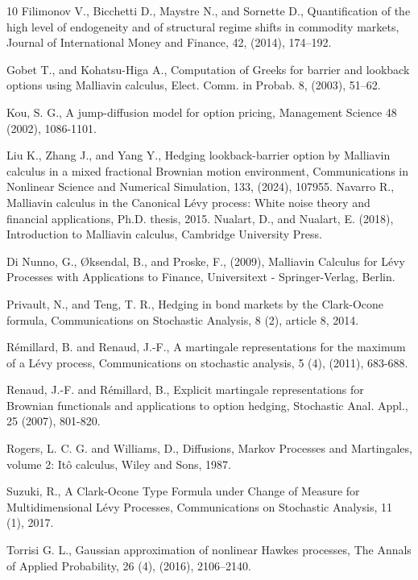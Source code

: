 \documentclass[11pt]{article}
\numberwithin{equation}{section}
\begin{document}
\begin{thebibliography}{10}
 { Filimonov  V.,  Bicchetti D., Maystre N., and  Sornette D.}, {Quantification of the high level
of endogeneity and of structural regime shifts in commodity markets}, Journal of International
Money and Finance, 42, (2014), 174–192.

 Gobet T., and  Kohatsu-Higa A., Computation of Greeks for barrier and lookback options using Malliavin calculus, Elect. Comm. in Probab. 8, (2003), 51–62.

  Kou, S. G., A jump-diffusion model for option pricing, Management Science 48 (2002), 1086-1101.

 Liu K., Zhang J., and Yang Y., Hedging lookback-barrier option by Malliavin calculus in a mixed
fractional Brownian motion environment, Communications in Nonlinear Science and Numerical Simulation, 133, (2024), 107955.
 Navarro R., Malliavin calculus in the Canonical Lévy process: White noise theory and financial applications, Ph.D. thesis, 2015. 
 Nualart, D., and Nualart, E. (2018), Introduction to Malliavin calculus, Cambridge University Press.

  Di Nunno, G., Øksendal, B., and Proske, F., (2009), Malliavin Calculus for Lévy Processes with Applications to Finance, Universitext - Springer-Verlag, Berlin.

  Privault, N., and Teng, T. R., Hedging in bond markets by the Clark-Ocone formula, Communications on Stochastic Analysis, 8 (2), article 8, 2014. 

 Rémillard, B. and Renaud, J.-F., A martingale representations for the maximum of a Lévy process,
 Communications on stochastic analysis, 5 (4), (2011), 683-688.

  Renaud, J.-F. and Rémillard, B., Explicit martingale representations for Brownian functionals and applications to option hedging, Stochastic Anal. Appl., 25 (2007), 801-820. 

   Rogers, L. C. G. and Williams, D., Diffusions, Markov Processes and Martingales, volume 2: Itô calculus, Wiley and Sons, 1987.

 Suzuki, R., A Clark-Ocone Type Formula under Change of Measure for
Multidimensional Lévy Processes, Communications on Stochastic Analysis, 11 (1), 2017.

  Torrisi G. L., Gaussian approximation of nonlinear Hawkes processes, The Annals of Applied Probability, 26 (4), (2016), 2106–2140.

\end{thebibliography}
\end{document}

